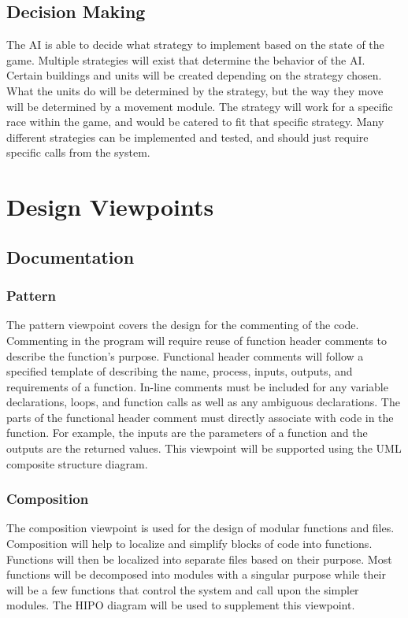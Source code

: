 \documentclass[10pt,letterpaper,onecolumn,draftclsnofoot]{IEEEtran}
\begin{document}
\subsection{Decision Making}
The AI is able to decide what strategy to implement based on the state of the game. Multiple strategies will exist that determine the behavior of the AI. Certain buildings and units will be created depending on the strategy chosen. What the units do will be determined by the strategy, but the way they move will be determined by a movement module. The strategy will work for a specific race within the game, and would be catered to fit that specific strategy. Many different strategies can be implemented and tested, and should just require specific calls from the system.
\section{Design Viewpoints}
\subsection{Documentation}
\subsubsection{Pattern}
	The pattern viewpoint covers the design for the commenting of the code. Commenting in the program will require reuse of function header comments to describe the function's purpose. Functional header comments will follow a specified template of describing the name, process, inputs, outputs, and requirements of a function. In-line comments must be included for any variable declarations, loops, and function calls as well as any ambiguous declarations. The parts of the functional header comment must directly associate with code in the function. For example, the inputs are the parameters of a function and the outputs are the returned values. This viewpoint will be supported using the UML composite structure diagram.
	
\subsubsection{Composition}
	The composition viewpoint is used for the design of modular functions and files. Composition will help to localize and simplify blocks of code into functions. Functions will then be localized into separate files based on their purpose. Most functions will be decomposed into modules with a singular purpose while their will be a few functions that control the system and call upon the simpler modules. The HIPO diagram will be used to supplement this viewpoint.
\end{document}
